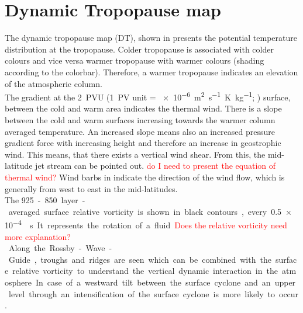 \section{Dynamic Tropopause map}
\label{sec:DT}
The dynamic tropopause map (DT), shown in  presents the potential temperature distribution at the tropopause. Colder tropopause is associated with colder colours and vice versa warmer tropopause with warmer colours (shading according to the colorbar). Therefore, a warmer tropopause indicates an elevation of the atmospheric column. 
\\
The gradient at the \SI{2}{PVU} (\SI{1}{PV} unit = \SI{e-6}{\metre\squared\per\s\kelvin\per\kg}; \cite{hoskins_use_1985}) surface, between the cold and warm area indicates the thermal wind. There is a slope between the cold and warm surfaces increasing towards the warmer column averaged temperature. An increased slope means also an increased pressure gradient force with increasing height and therefore an increase in geostrophic wind. This means, that there exists a vertical wind shear. From this, the mid-latitude jet stream can be pointed out.  \textcolor{red}{do I need to present the equation of thermal wind?} Wind barbs in \SI{}{\mPs} indicate the direction of the wind flow, which is generally from west to east in the mid-latitudes.  
\\
The  \SI{925}-\SI{850}{\hPa} layer-averaged surface relative vorticity is shown in black contours, every \SI{.5e-4}{\per\second}. It represents the rotation of a fluid. \textcolor{red}{Does the relative vorticity need more explanation? }
\\
Along the Rossby-Wave-Guide, troughs and ridges are seen which can be combined with the surface relative vorticity to understand the vertical dynamic interaction in the atmosphere. In case of a westward tilt between the surface cyclone and an upper level through an intensification of the surface cyclone is more likely to occur.


